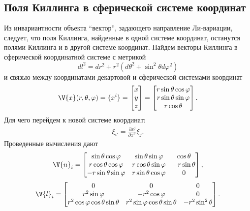 \subsection{Поля Киллинга в сферической системе координат}

    Из инвариантности объекта \enquote{вектор}, задающего направление Ли-вариации, следует, что поля Киллинга, найденные в одной системе координат, останутся полями Киллинга и в другой системе координат. Найдем векторы Киллинга в сферической координатной системе с метрикой
    \begin{equation}
        dl^2 = dr^2 + r^2 (d\theta^2 + \sin ^2 \theta d\varphi^2)
    \end{equation}
    и связью между координатами декартовой и сферической системами координат
    \begin{equation}
        \V{x}(r, \theta, \varphi)
        =
        \{x^i\}
        =
        \begin{bmatrix}
            x \\ y \\ z
        \end{bmatrix}
        =
        \begin{bmatrix}
            r \sin\theta \cos\varphi \\
            r \sin\theta \sin\varphi \\
            r \cos\theta
        \end{bmatrix}
        .
    \end{equation}
    Для чего перейдем к новой системе координат:
    \begin{equation}\begin{aligned}
        \xi_{i'} = \frac{\partial x^j}{\partial x^{i'}} \xi_j.
    \end{aligned}\end{equation}
    Проведенные вычисления дают
    \begin{equation}
        \V{n}_i
        =
        \begin{bmatrix}
            \sin\theta \cos\varphi     & \sin\theta \sin\varphi   & \cos\theta \\
            r \cos\theta \cos\varphi   & r \cos\theta \sin\varphi & - r \sin\theta \\
            - r \sin\theta \sin\varphi & r \sin\theta \cos\varphi & 0
        \end{bmatrix}
        ,
    \end{equation}
    \begin{equation}
        \V{l}_i
        =
        \begin{bmatrix}
            0
                & 0
                & 0 \\
            r^2 \sin\varphi
                & - r^2 \cos\varphi
                & 0 \\
            r^2 \cos\varphi \cos\theta \sin\theta
                & r^2 \sin\varphi \cos\theta \sin\theta
                & - r^2 \sin^2\theta
        \end{bmatrix}
        .
    \end{equation}
